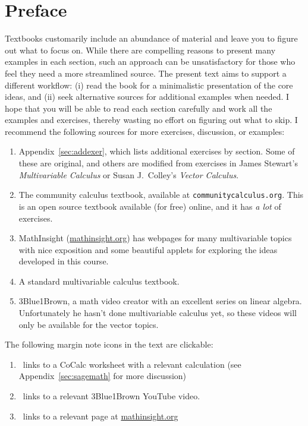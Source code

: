 \documentclass[prettycode,shellescape]{watsonbook}
\begin{document}

\newpage 
\pagecolor{white} 
\hphantom{a} \thispagestyle{empty} 
\newpage

\chapter*{Preface} \thispagestyle{empty} 

Textbooks customarily include an abundance of material and leave you
to figure out what to focus on. While there are compelling reasons to
present many examples in each section, such an approach can be
unsatisfactory for those who feel they need a more streamlined
source. The present text aims to support a different workflow: (i)
read the book for a minimalistic presentation of the core ideas, and
(ii) seek alternative sources for additional examples when needed. I
hope that you will be able to read each section carefully and work all
the examples and exercises, thereby wasting no effort on figuring out
what to skip. I recommend the following sources for more exercises,
discussion, or examples:
\begin{enumerate}[itemsep = 3pt]
\item Appendix~\ref{sec:addexer}, which lists additional exercises by
  section. Some of these are original, and others are
  modified from exercises in 
  James Stewart's \textit{Multivariable Calculus} or Susan J.\ Colley's \textit{Vector
    Calculus}. 
\item The community calculus textbook, available at
  \texttt{communitycalculus.org}. This is an open source textbook available (for
  free) online, and it has \textit{a lot} of exercises. 
\item MathInsight (\url{mathinsight.org}) has webpages for many
  multivariable topics with nice exposition and some beautiful applets for exploring the
  ideas developed in this course. 
\item A standard multivariable calculus textbook.  
\item 3Blue1Brown, a math video creator with an excellent series on
  linear algebra. Unfortunately he hasn't done multivariable calculus
  yet, so these videos will only be available for the vector topics. 
\end{enumerate}

The following margin note icons in the text are clickable:
\begin{enumerate}[itemsep=6pt, topsep = -6pt]
\item \href{http://cocalc.com}{\cocalc}\,
  links to a CoCalc worksheet with a relevant calculation (see Appendix~\ref{sec:sagemath} for more
  discussion)
\item \href{http://3blue1brown.com}{\tbob} \, links to a relevant 3Blue1Brown YouTube video.
\item \href{http://mathinsight.org}{\mi} \, links to a relevant page at \url{mathinsight.org}
\end{enumerate}
\end{document}
